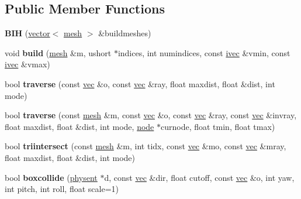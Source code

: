 \subsection*{Public Member Functions}
\begin{DoxyCompactItemize}
\item 
\mbox{\label{struct_b_i_h_a4a1d96504f62de65d81e6c06fad6df95}} 
{\bfseries B\+IH} (\hyperlink{structvector}{vector}$<$ \hyperlink{struct_b_i_h_1_1mesh}{mesh} $>$ \&buildmeshes)
\item 
\mbox{\label{struct_b_i_h_a8d450c6727f42ead5aa3109dc93fb769}} 
void {\bfseries build} (\hyperlink{struct_b_i_h_1_1mesh}{mesh} \&m, ushort $\ast$indices, int numindices, const \hyperlink{structivec}{ivec} \&vmin, const \hyperlink{structivec}{ivec} \&vmax)
\item 
\mbox{\label{struct_b_i_h_ac662df92c82507c40746c423f47f1cdc}} 
bool {\bfseries traverse} (const \hyperlink{structvec}{vec} \&o, const \hyperlink{structvec}{vec} \&ray, float maxdist, float \&dist, int mode)
\item 
\mbox{\label{struct_b_i_h_aec96572a18eef6013c9af964bc1a18f6}} 
bool {\bfseries traverse} (const \hyperlink{struct_b_i_h_1_1mesh}{mesh} \&m, const \hyperlink{structvec}{vec} \&o, const \hyperlink{structvec}{vec} \&ray, const \hyperlink{structvec}{vec} \&invray, float maxdist, float \&dist, int mode, \hyperlink{struct_b_i_h_1_1node}{node} $\ast$curnode, float tmin, float tmax)
\item 
\mbox{\label{struct_b_i_h_ad0e3bb00b361092705b7f88fe7bc762d}} 
bool {\bfseries triintersect} (const \hyperlink{struct_b_i_h_1_1mesh}{mesh} \&m, int tidx, const \hyperlink{structvec}{vec} \&mo, const \hyperlink{structvec}{vec} \&mray, float maxdist, float \&dist, int mode)
\item 
\mbox{\label{struct_b_i_h_ace158c17b8c16818edb053f1a673a7ce}} 
bool {\bfseries boxcollide} (\hyperlink{structphysent}{physent} $\ast$d, const \hyperlink{structvec}{vec} \&dir, float cutoff, const \hyperlink{structvec}{vec} \&o, int yaw, int pitch, int roll, float scale=1)
\item 
\mbox{\label{struct_b_i_h_a1ebb0933334624cc462e82afbd2d138e}} 

\end{DoxyCompactItemize}
